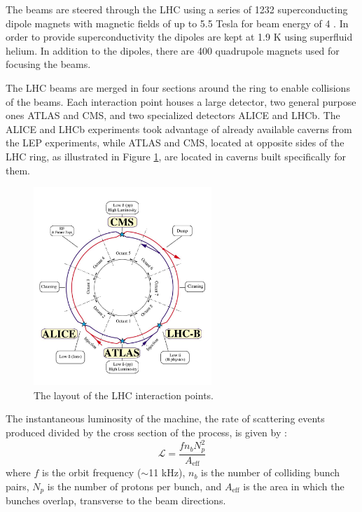 The beams are steered through the LHC 
using a series of 1232 superconducting dipole magnets with magnetic fields 
of up to 5.5 Tesla for beam energy of 4 \TeV. In order to provide superconductivity the 
dipoles are kept at 1.9 K using superfluid helium.
In addition to the dipoles, there are 400 quadrupole magnets used
for focusing the beams.

The LHC beams are
merged in four sections around the ring to enable collisions of the beams. Each interaction point
houses a large detector, two general purpose ones ATLAS and CMS, and two specialized detectors
ALICE and LHCb. The ALICE and LHCb experiments took advantage of already available caverns from
the LEP experiments, while ATLAS and CMS, located at opposite sides of the LHC ring, as illustrated
in Figure \ref{fig:lhc}, are located in caverns built specifically for them.

\begin{figure}[htbp]
\centering
\includegraphics[width=0.6\textwidth]{plots/intro/lhc.jpg}
\caption{The layout of the LHC interaction points.\label{fig:lhc}}
\end{figure}

The instantaneous luminosity of the machine, \ie the rate of scattering events produced divided
by the cross section of the process, is given by \cite{Aaij:2011er}:
\begin{equation}
\mathcal{L}=\frac{f n_b N_p^2}{A_{\mathrm{eff}}}
\end{equation}
where $f$ is the orbit frequency ($\sim$11 kHz), $n_b$ is the number of colliding bunch pairs, 
$N_p$ is the number of protons per bunch, and $A_{\mathrm{eff}}$ is the area in which the bunches
overlap, transverse to the beam directions.


